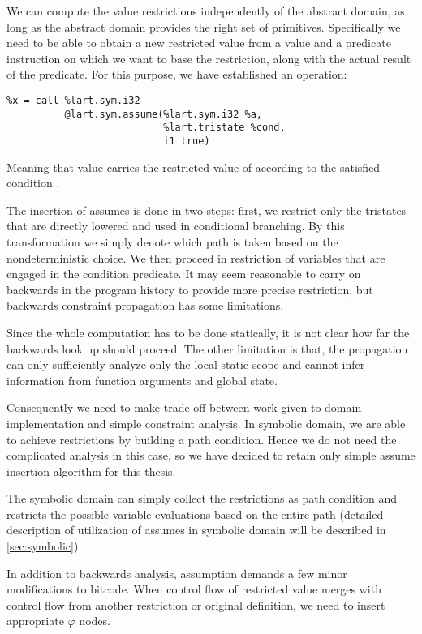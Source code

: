 We can compute the value restrictions independently of the abstract domain, as
long as the abstract domain provides the right set of primitives. Specifically we
need to be able to obtain a new restricted value from a value and a predicate
instruction on which we want to base the restriction, along with the actual
result of the predicate. For this purpose, we have established
an  operation:
\begin{verbatim}
%x = call %lart.sym.i32
          @lart.sym.assume(%lart.sym.i32 %a,
                           %lart.tristate %cond,
                           i1 true)
\end{verbatim}
Meaning that value  carries the restricted value of 
according to the satisfied condition .

The insertion of assumes is done in two steps: first, we restrict only the
tristates that are directly lowered and used in conditional branching. By this
transformation we simply denote which path is taken based on the nondeterministic
choice. We then proceed in restriction of variables that are engaged in the condition
predicate. It may seem reasonable to carry on backwards in the program history to
provide more precise restriction, but backwards constraint propagation has some
limitations.


Since the whole computation has to be done statically, it is not clear how far the
backwards look up should proceed. The other limitation is that, the propagation
can only sufficiently analyze only the local static scope and cannot infer
information from function arguments and global state.

Consequently we need to make trade-off between work given to domain
implementation and simple constraint analysis. In symbolic domain, we are able
to achieve restrictions by building a path condition. Hence we do not need the
complicated analysis in this case, so we have decided to retain only simple
assume insertion algorithm for this thesis.

The symbolic domain can simply collect the restrictions as path condition and
restricts the possible variable evaluations based on the entire path
(detailed description of utilization of assumes in symbolic domain will be
described in \autoref{sec:symbolic}).

In addition to backwards analysis, assumption demands a few minor
modifications to bitcode. When control flow of restricted value merges with
control flow from another restriction or original definition, we need to insert
appropriate $\varphi$ nodes.

